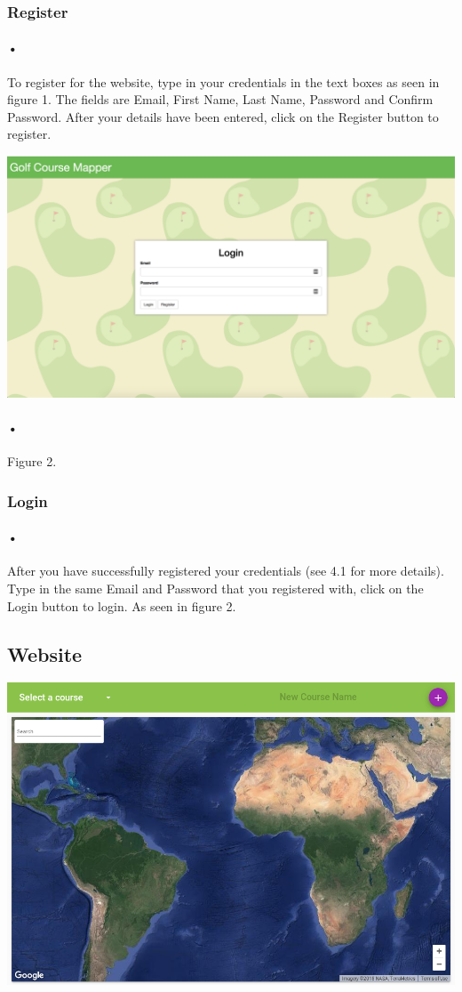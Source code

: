\documentclass{article}
\begin{document}
	\subsubsection{Register}
	\paragraph{•}
	To register for the website, type in your credentials in the text boxes as seen in figure 1. The fields are Email, First Name, Last Name, Password and Confirm Password. After your details have been entered, click on the Register button to register.
	
		
	
	\includegraphics[scale=0.25]{Login}
	\paragraph{•}
    Figure 2.
	\subsubsection{Login}
	\paragraph{•}
	After you have successfully registered your credentials (see 4.1 for more details). Type in the same Email and Password that you registered with, click on the Login button to login. As seen in figure 2.
	
    \subsection{Website}
    \includegraphics[scale=0.25]{map}
\end{document}

